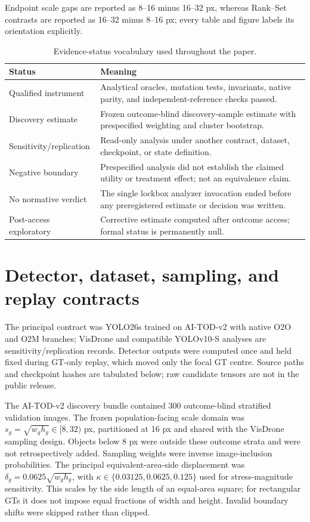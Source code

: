 \documentclass[preprint,10pt]{elsarticle}
\begin{document}
Endpoint scale gaps are reported as 8--16 minus 16--32 px, whereas Rank--Set contrasts are reported as 16--32 minus 8--16 px; every table and figure labels its orientation explicitly.

\begin{table}[ht]
\centering
\caption{Evidence-status vocabulary used throughout the paper.}
\begin{tabularx}{\textwidth}{@{}p{}X@{}}
\toprule
Status & Meaning \\
\midrule
Qualified instrument & Analytical oracles, mutation tests, invariants, native parity, and independent-reference checks passed. \\
Discovery estimate & Frozen outcome-blind discovery-sample estimate with prespecified weighting and cluster bootstrap. \\
Sensitivity/replication & Read-only analysis under another contract, dataset, checkpoint, or state definition. \\
Negative boundary & Prespecified analysis did not establish the claimed utility or treatment effect; not an equivalence claim. \\
No normative verdict & The single lockbox analyzer invocation ended before any preregistered estimate or decision was written. \\
Post-access exploratory & Corrective estimate computed after outcome access; formal status is permanently null. \\
\bottomrule
\end{tabularx}
\end{table}

\section{Detector, dataset, sampling, and replay contracts}

The principal contract was YOLO26s trained on AI-TOD-v2 with native O2O and O2M branches; VisDrone and compatible YOLOv10-S analyses are sensitivity/replication records. Detector outputs were computed once and held fixed during GT-only replay, which moved only the focal GT centre. Source paths and checkpoint hashes are tabulated below; raw candidate tensors are not in the public release.

The AI-TOD-v2 discovery bundle contained 300 outcome-blind stratified validation images. The frozen population-facing scale domain was $s_g=\sqrt{w_gh_g}\in[8,32)$ px, partitioned at 16 px and shared with the VisDrone sampling design. Objects below 8 px were outside these outcome strata and were not retrospectively added. Sampling weights were inverse image-inclusion probabilities. The principal equivalent-area-side displacement was $\delta_g=0.0625\sqrt{w_gh_g}$, with $\kappa\in\{0.03125,0.0625,0.125\}$ used for stress-magnitude sensitivity. This scales by the side length of an equal-area square; for rectangular GTs it does not impose equal fractions of width and height. Invalid boundary shifts were skipped rather than clipped.
\end{document}
